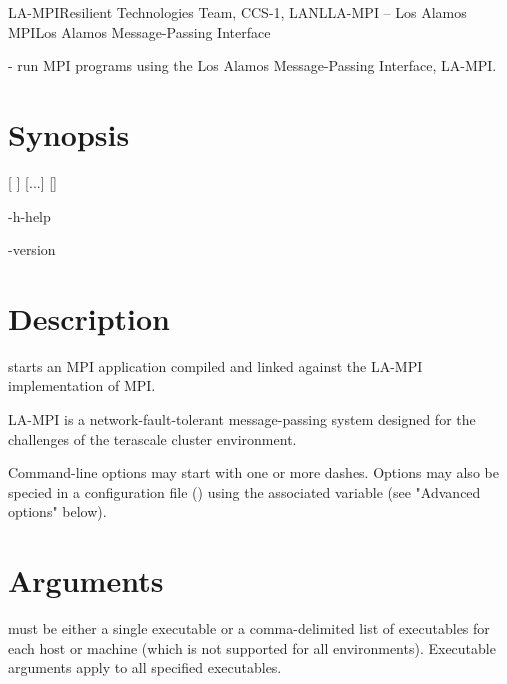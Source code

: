 \documentclass[english]{article}
\begin{document}
\begin{Name}{1}{LA-MPI}{Resilient Technologies Team, CCS-1, LANL}{LA-MPI -- Los Alamos MPI}{Los Alamos Message-Passing Interface}

   - run MPI programs using the Los Alamos Message-Passing Interface, LA-MPI.
\end{Name}

\section{Synopsis}

 [\Bar{} ] 
 [...]  []

 -h\Bar-help

 -version

\section{Description}
 starts an MPI application compiled and linked against the
LA-MPI implementation of MPI.

LA-MPI is a network-fault-tolerant message-passing system designed for
the challenges of the terascale cluster environment.

Command-line options may start with one or more dashes. Options
may also be specied in a configuration file ()
using the associated variable (see "Advanced options" below).

\section{Arguments}
 must be either a single executable or a
comma-delimited list of executables for each host or machine (which is
not supported for all environments). Executable arguments apply to all
specified executables.
\end{document}

